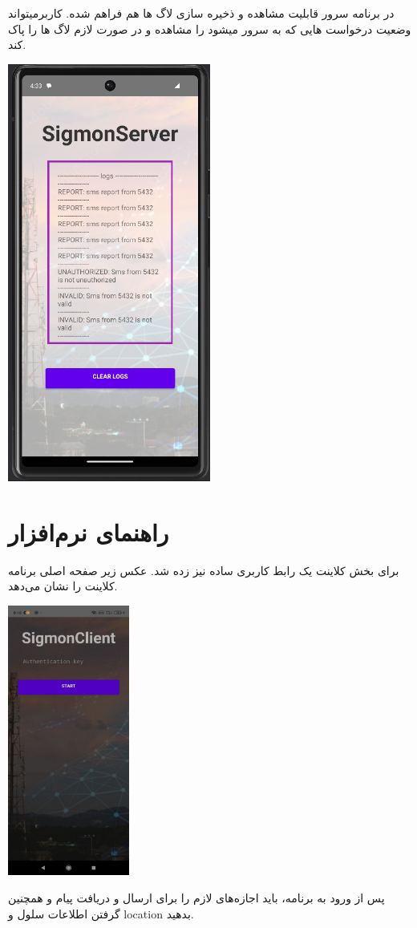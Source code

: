 \documentclass{article}
\begin{document}
در برنامه سرور قابلیت مشاهده و ذخیره سازی لاگ ها هم فراهم شده. کاربرمیتواند وضعیت درخواست هایی که به سرور میشود را مشاهده و در صورت لازم لاگ ها را پاک کند.

\singlespacing
\includegraphics[width=0.5\textwidth]{logs.png}\par\vspace{1cm}



\section*{راهنمای نرم‌افزار}
برای بخش کلاینت یک رابط کاربری ساده نیز زده شد. عکس زیر صفحه اصلی برنامه کلاینت را نشان می‌دهد.
\singlespacing

\includegraphics[width=0.3\textwidth]{main.jpg}\par\vspace{1cm}
پس از ورود به برنامه، باید اجازه‌های لازم را برای ارسال و دریافت پیام و همچنین گرفتن اطلاعات سلول و location بدهید.
\singlespacing
\end{document}
